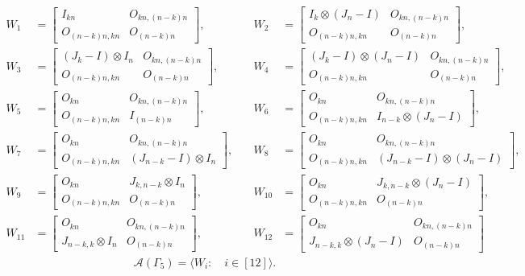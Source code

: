 \[
\begin{aligned}
W_1 &= 
\begin{bmatrix}
I_{kn} & O_{kn, (n-k)n} \\
O_{(n-k)n,kn} & O_{(n-k)n}
\end{bmatrix},
& \quad
W_2 &= 
\begin{bmatrix}
I_k \otimes (J_n - I) & O_{kn, (n-k)n} \\
O_{(n-k)n,kn} & O_{(n-k)n}
\end{bmatrix}, \\[1em]
W_3 &= 
\begin{bmatrix}
(J_k - I) \otimes I_n & O_{kn, (n-k)n} \\
O_{(n-k)n,kn} & O_{(n-k)n}
\end{bmatrix},
& \quad
W_4 &= 
\begin{bmatrix}
(J_k - I) \otimes (J_n - I) & O_{kn, (n-k)n} \\
O_{(n-k)n,kn} & O_{(n-k)n}
\end{bmatrix}, \\[1em]
W_5 &= 
\begin{bmatrix}
O_{kn} & O_{kn, (n-k)n} \\
O_{(n-k)n,kn} & I_{(n - k)n}
\end{bmatrix},
& \quad
W_6 &= 
\begin{bmatrix}
O_{kn} & O_{kn, (n-k)n} \\
O_{(n-k)n,kn} & I_{n - k} \otimes (J_n - I)
\end{bmatrix}, \\[1em]
W_7 &= 
\begin{bmatrix}
O_{kn} & O_{kn, (n-k)n} \\
O_{(n-k)n,kn} & (J_{n - k} - I) \otimes I_n
\end{bmatrix},
& \quad
W_8 &= 
\begin{bmatrix}
O_{kn} & O_{kn, (n-k)n} \\
O_{(n-k)n,kn} & (J_{n - k} - I) \otimes (J_n - I)
\end{bmatrix}, \\[1em]
W_9 &= 
\begin{bmatrix}
O_{kn} & J_{k,n-k} \otimes I_n \\
O_{(n-k)n,kn} & O_{(n-k)n}
\end{bmatrix},
& \quad
W_{10} &=
\begin{bmatrix}
O_{kn} & J_{k,n-k} \otimes (J_n - I) \\
O_{(n-k)n,kn} & O_{(n-k)n}
\end{bmatrix}, \\[1em]
W_{11} &=
\begin{bmatrix}
O_{kn} & O_{kn, (n-k)n} \\
J_{n-k, k}\otimes I_n & O_{(n-k)n}
\end{bmatrix}, 
& \quad
W_{12} &=
\begin{bmatrix}
O_{kn} & O_{kn, (n-k)n} \\
J_{n-k, k}\otimes (J_n-I) & O_{(n-k)n}
\end{bmatrix}
\end{aligned}
\]
\begin{align*}
    \mathcal{A}(\Gamma_5) = \langle W_i: \quad i\in[12]\rangle.
\end{align*}

